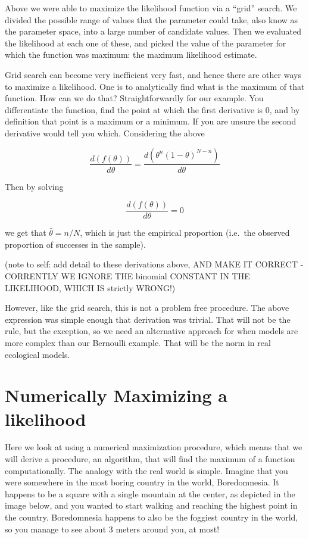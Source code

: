 \documentclass[
]{book}
\begin{document}
Above we were able to maximize the likelihood function via a ``grid'' search. We divided the possible range of values that the parameter could take, also know as the parameter space, into a large number of candidate values. Then we evaluated the likelihood at each one of these, and picked the value of the parameter for which the function was maximum: the maximum likelihood estimate.

Grid search can become very inefficient very fast, and hence there are other ways to maximize a likelihood. One is to analytically find what is the maximum of that function. How can we do that? Straightforwardly for our example. You differentiate the function, find the point at which the first derivative is 0, and by definition that point is a maximum or a minimum. If you are unsure the second derivative would tell you which. Considering the above

\[\frac{d(f(\theta))}{d \theta}=\frac{d(\theta^n (1-\theta)^{N-n})}{d \theta}\]

Then by solving

\[\frac{d(f(\theta))}{d \theta}=0\]

we get that \(\hat \theta = n/N\), which is just the empirical proportion (i.e.~the observed proportion of successes in the sample).

(note to self: add detail to these derivations above, AND MAKE IT CORRECT - CORRENTLY WE IGNORE THE binomial CONSTANT IN THE LIKELIHOOD, WHICH IS strictly WRONG!)

However, like the grid search, this is not a problem free procedure. The above expression was simple enough that derivation was trivial. That will not be the rule, but the exception, so we need an alternative approach for when models are more complex than our Bernoulli example. That will be the norm in real ecological models.

\section{Numerically Maximizing a likelihood}\label{numerically-maximizing-a-likelihood}

Here we look at using a numerical maximization procedure, which means that we will derive a procedure, an algorithm, that will find the maximum of a function computationally. The analogy with the real world is simple. Imagine that you were somewhere in the most boring country in the world, Boredomnesia. It happens to be a square with a single mountain at the center, as depicted in the image below, and you wanted to start walking and reaching the highest point in the country. Boredomnesia happens to also be the foggiest country in the world, so you manage to see about 3 meters around you, at most!
\end{document}
